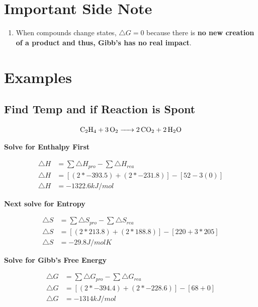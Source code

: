 \documentclass[12pt]{article}
\begin{document}
\section{Important Side Note}

\begin{enumerate}
\item When compounds change states, $\triangle{G} = 0$ because there is \textbf{no new creation of a product and thus, Gibb's has no real impact}.
\end{enumerate}

\pagebreak






\section{Examples}

\subsection{Find Temp and if Reaction is Spont}

$$\ce{C2H4 + 3O2 -> 2CO2 + 2H2O}$$

\textbf{Solve for Enthalpy First}

\begin{align*}
\triangle{H} 			& = \sum{\triangle{H}_{pro}} - \sum{\triangle{H}_{rea}}\\
\triangle{H} 			&= [(2*-393.5) + (2*-231.8)] - [52 - 3(0)]\\
\triangle{H}			& = -1322.6kJ/mol
\end{align*}

\textbf{Next solve for Entropy}

\begin{align*}
\triangle{S} 		&= \sum{\triangle{S}_{pro}} - \sum{\triangle{S}_{rea}}\\
\triangle{S} 		&= [(2*213.8) + (2*188.8)] - [220 + 3*205]\\
\triangle{S} 		&= -29.8 J/molK
\end{align*}

\textbf{Solve for Gibb's Free Energy}

\begin{align*}
\triangle{G} 		&= \sum{\triangle{G}_{pro}} - \sum{\triangle{G}_{rea}}\\
\triangle{G} 		&= [(2*-394.4) + (2*-228.6)] - [68 + 0]\\
\triangle{G} 		&= -1314kJ/mol
\end{align*}
\end{document}
